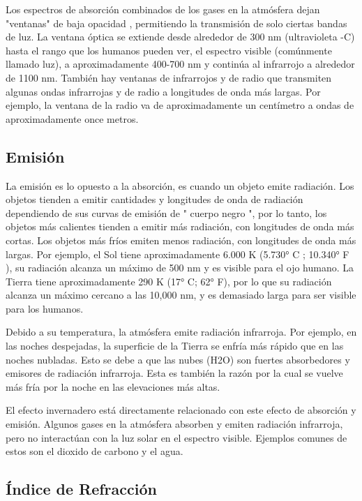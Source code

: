 \documentclass[12pt]{article}
\begin{document}
Los espectros de absorción combinados de los gases en la atmósfera dejan "ventanas" de baja opacidad , permitiendo la transmisión de solo ciertas bandas de luz. La ventana óptica se extiende desde alrededor de 300 nm (ultravioleta -C) hasta el rango que los humanos pueden ver, el espectro visible (comúnmente llamado luz), a aproximadamente 400-700 nm y continúa al infrarrojo a alrededor de 1100 nm. También hay ventanas de infrarrojos y de radio que transmiten algunas ondas infrarrojas y de radio a longitudes de onda más largas. Por ejemplo, la ventana de la radio va de aproximadamente un centímetro a ondas de aproximadamente once metros.

\subsection{Emisión}
La emisión es lo opuesto a la absorción, es cuando un objeto emite radiación. Los objetos tienden a emitir cantidades y longitudes de onda de radiación dependiendo de sus curvas de emisión de " cuerpo negro ", por lo tanto, los objetos más calientes tienden a emitir más radiación, con longitudes de onda más cortas. Los objetos más fríos emiten menos radiación, con longitudes de onda más largas. Por ejemplo, el Sol tiene aproximadamente 6.000  K (5.730° C ; 10.340° F ), su radiación alcanza un máximo de 500 nm y es visible para el ojo humano. La Tierra tiene aproximadamente 290 K (17° C; 62° F), por lo que su radiación alcanza un máximo cercano a las 10,000 nm, y es demasiado larga para ser visible para los humanos.

Debido a su temperatura, la atmósfera emite radiación infrarroja. Por ejemplo, en las noches despejadas, la superficie de la Tierra se enfría más rápido que en las noches nubladas. Esto se debe a que las nubes (H2O) son fuertes absorbedores y emisores de radiación infrarroja. Esta es también la razón por la cual se vuelve más fría por la noche en las elevaciones más altas.

El efecto invernadero está directamente relacionado con este efecto de absorción y emisión. Algunos gases en la atmósfera absorben y emiten radiación infrarroja, pero no interactúan con la luz solar en el espectro visible. Ejemplos comunes de estos son el dioxido de carbono y el agua.

\subsection{Índice de Refracción}
\end{document}
